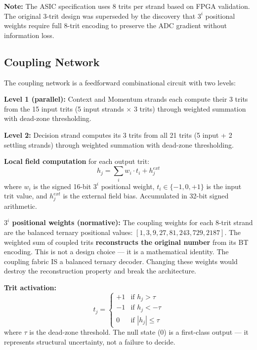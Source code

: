 \documentclass[11pt, a4paper]{article}
\begin{document}
\textbf{Note:} The ASIC specification uses 8 trits per strand based on
FPGA validation. The original 3-trit design was superseded by the
discovery that $3^i$ positional weights require full 8-trit encoding
to preserve the ADC gradient without information loss.

\subsection{Coupling Network}

The coupling network is a feedforward combinational circuit with
two levels:

\textbf{Level 1 (parallel):}
Context and Momentum strands each compute their 3 trits from the
15 input trits (5 input strands $\times$ 3 trits) through weighted
summation with dead-zone thresholding.

\textbf{Level 2:}
Decision strand computes its 3 trits from all 21 trits (5 input +
2 settling strands) through weighted summation with dead-zone
thresholding.

\textbf{Local field computation} for each output trit:
\begin{equation}
  h_j = \sum_{i} w_i \cdot t_i + h_j^{ext}
\end{equation}
where $w_i$ is the signed 16-bit $3^i$ positional weight, $t_i \in \{-1, 0, +1\}$
is the input trit value, and $h_j^{ext}$ is the external field bias.
Accumulated in 32-bit signed arithmetic.

\textbf{$3^i$ positional weights (normative):} The coupling weights for
each 8-trit strand are the balanced ternary positional values:
$[1, 3, 9, 27, 81, 243, 729, 2187]$. The weighted sum of coupled trits
\textbf{reconstructs the original number} from its BT encoding. This is
not a design choice --- it is a mathematical identity. The coupling
fabric IS a balanced ternary decoder. Changing these weights would
destroy the reconstruction property and break the architecture.

\textbf{Trit activation:}
\begin{equation}
  t_j = \begin{cases}
    +1 & \text{if } h_j > \tau \\
    -1 & \text{if } h_j < -\tau \\
    0  & \text{if } |h_j| \leq \tau
  \end{cases}
\end{equation}
where $\tau$ is the dead-zone threshold. The null state (0) is a
first-class output — it represents structural uncertainty, not
a failure to decide.
\end{document}
